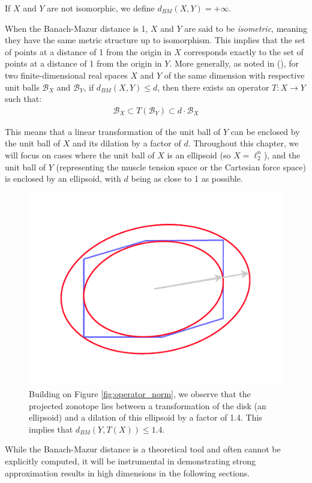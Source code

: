 If $X$ and $Y$ are not isomorphic, we define $d_{BM}(X,Y) = +\infty$.

When the Banach-Mazur distance is 1, $X$ and $Y$ are said to be \emph{isometric}, meaning they have the same metric structure up to isomorphism. This implies that the set of points at a distance of 1 from the origin in $X$ corresponds exactly to the set of points at a distance of 1 from the origin in $Y$. More generally, as noted in (\cite{milmanDvoretzkyTheoremThirtyYearsLater1992}), for two finite-dimensional real spaces $X$ and $Y$ of the same dimension with respective unit balls $\mathcal{B}_X$ and $\mathcal{B}_Y$, if $d_{BM}(X,Y) \leq d$, then there exists an operator $T: X \rightarrow Y$ such that:
\begin{align*}
\mathcal{B}_X \subset T(\mathcal{B}_Y) \subset d \cdot \mathcal{B}_X
\end{align*}

This means that a linear transformation of the unit ball of $Y$ can be enclosed by the unit ball of $X$ and its dilation by a factor of $d$. Throughout this chapter, we will focus on cases where the unit ball of $X$ is an ellipsoid (so $X = \ell_2^n$), and the unit ball of $Y$ (representing the muscle tension space or the Cartesian force space) is enclosed by an ellipsoid, with $d$ being as close to 1 as possible.

\begin{figure}[!htb]
  \captionsetup{justification=centering}
    \centering
    \includegraphics[trim={0 25 0 25},clip, width=0.5\linewidth]{img/chapter_3/banachmazurdvoretzky.pdf}
  \caption{Building on Figure \ref{fig:operator_norm}, we observe that the projected zonotope lies between a transformation of the disk (an ellipsoid) and a dilation of this ellipsoid by a factor of 1.4. This implies that $d_{BM}(Y, T(X)) \leq 1.4$.}
  \label{fig:banach_mazur_example}
\end{figure}

While the Banach-Mazur distance is a theoretical tool and often cannot be explicitly computed, it will be instrumental in demonstrating strong approximation results in high dimensions in the following sections.

